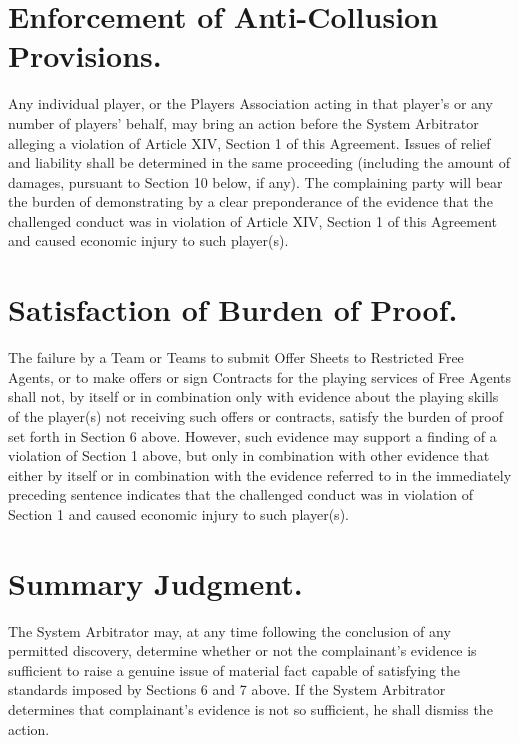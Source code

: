 \documentclass[
]{book}
\begin{document}
\hypertarget{enforcement-of-anti-collusion-provisions.}{%
\section{Enforcement of Anti-Collusion Provisions.}\label{enforcement-of-anti-collusion-provisions.}}

Any individual player, or the Players Association acting in that player's or any number of players' behalf, may bring an action before the System Arbitrator alleging a violation of Article XIV, Section 1 of this Agreement. Issues of relief and liability shall be determined in the same proceeding (including the amount of damages, pursuant to Section 10 below, if any). The complaining party will bear the burden of demonstrating by a clear preponderance of the evidence that the challenged conduct was in violation of Article XIV, Section 1 of this Agreement and caused economic injury to such player(s).

\hypertarget{satisfaction-of-burden-of-proof.}{%
\section{Satisfaction of Burden of Proof.}\label{satisfaction-of-burden-of-proof.}}

The failure by a Team or Teams to submit Offer Sheets to Restricted Free Agents, or to make offers or sign Contracts for the playing services of Free Agents shall not, by itself or in combination only with evidence about the playing skills of the player(s) not receiving such offers or contracts, satisfy the burden of proof set forth in Section 6 above. However, such evidence may support a finding of a violation of Section 1 above, but only in combination with other evidence that either by itself or in combination with the evidence referred to in the immediately preceding sentence indicates that the challenged conduct was in violation of Section 1 and caused economic injury to such player(s).

\hypertarget{summary-judgment.}{%
\section{Summary Judgment.}\label{summary-judgment.}}

The System Arbitrator may, at any time following the conclusion of any permitted discovery, determine whether or not the complainant's evidence is sufficient to raise a genuine issue of material fact capable of satisfying the standards imposed by Sections 6 and 7 above. If the System Arbitrator determines that complainant's evidence is not so sufficient, he shall dismiss the action.
\end{document}

